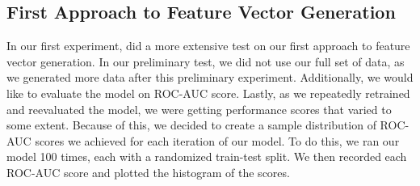 \documentclass[10pt,twocolumn,letterpaper]{article}
\begin{document}
\subsection{First Approach to Feature Vector Generation}
In our first experiment, did a more extensive test on our first approach to feature vector generation. In our preliminary test,
we did not use our full set of data, as we generated more data after this preliminary experiment. Additionally, we would like to evaluate
the model on ROC-AUC score. Lastly, as we repeatedly retrained and reevaluated the model, we were getting performance scores that varied 
to some extent. Because of this, we decided to create a sample distribution of ROC-AUC scores we achieved for each iteration of our model. To do this,
we ran our model 100 times, each with a randomized train-test split. We then recorded each ROC-AUC score and plotted the histogram of the scores.
{\small


}
\end{document}
